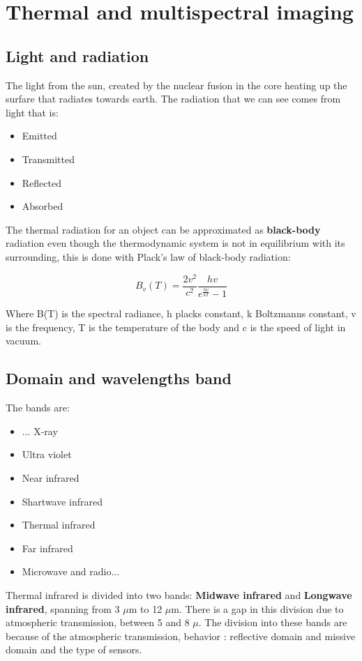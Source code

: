 \section{Thermal and multispectral imaging}

	\subsection*{Light and radiation}
	The light from the sun, created by the nuclear fusion in the core heating up the surfare that radiates towards earth. The radiation that we can see comes from light that is:
		
		\begin{itemize}
			\item Emitted
			\item Transmitted
			\item Reflected
			\item Absorbed
		\end{itemize}

	The thermal radiation for an object can be approximated as \textbf{black-body} radiation even though the thermodynamic system is not in equilibrium with its surrounding, this is done with Plack's law of black-body radiation:

		\begin{equation}
			B_v(T) = \frac{2v^2} {c^2} \frac{hv} {e^{\frac{hv} {kT} }-1}   		  
		\end{equation}

	Where B(T) is the spectral radiance, h placks constant, k Boltzmanns constant, v is the frequency, T is the temperature of the body and c is the speed of light in vacuum.
	
	\subsection*{Domain and wavelengths band}
	The bands are:
	\begin{itemize}
		\item  ... X-ray 
		\item Ultra violet
		\item Near infrared
		\item Shartwave infrared
		\item Thermal infrared
		\item Far infrared
		\item Microwave and radio...
	\end{itemize}
	Thermal infrared is divided into two bands: \textbf{Midwave infrared} and \textbf{Longwave infrared}, spanning from 3 $\mu$m to 12 $\mu$m. There is a gap in this division due to atmospheric transmission, between 5 and 8 $\mu$.
	The division into these bands are because of the atmospheric transmission, behavior : reflective domain and missive domain and the type of sensors.

